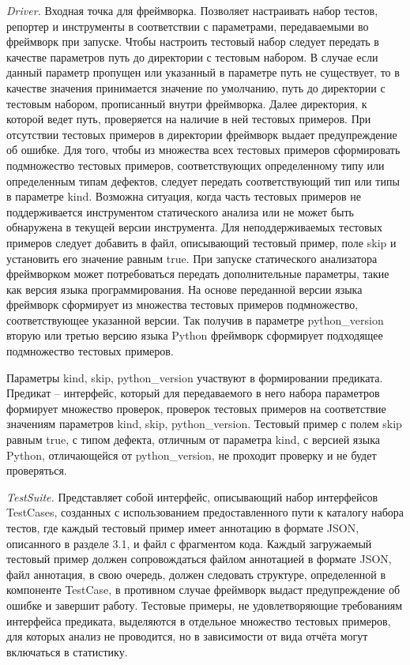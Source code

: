 \textit{Driver.} Входная точка для фреймворка. Позволяет настраивать набор тестов, репортер и инструменты в соответствии с параметрами, передаваемыми во фреймворк при запуске. Чтобы настроить тестовый набор следует передать
в качестве параметров путь до директории с тестовым набором. В случае если данный
параметр пропущен или указанный в параметре путь не существует, то в качестве значения принимается значение по умолчанию, путь до директории с тестовым набором, прописанный внутри фреймворка. Далее директория, к которой
ведет путь, проверяется на наличие в ней тестовых примеров. При отсутствии тестовых примеров в директории фреймворк выдает предупреждение об ошибке.
Для того, чтобы из множества всех тестовых
примеров сформировать подмножество тестовых примеров, соответствующих
определенному типу или определенным типам дефектов, следует передать соответствующий тип или типы в параметре kind. Возможна ситуация, когда часть
тестовых примеров не поддерживается инструментом статического анализа или не может быть обнаружена в текущей версии инструмента. Для
неподдерживаемых тестовых примеров следует добавить в файл, описывающий
тестовый пример, поле skip и установить его значение равным true.
При запуске статического анализатора фреймворком может потребоваться передать дополнительные параметры, такие как версия языка программирования. 
На основе переданной версии языка фреймворк сформирует из множества тестовых примеров подмножество, соответствующее указанной версии.
Так получив в параметре python\_version вторую или третью версию языка Python фреймворк сформирует подходящее подмножество тестовых примеров. 

Параметры kind, skip, python\_version участвуют в формировании предиката. Предикат
-- интерфейс, который для передаваемого в него набора параметров формирует
множество проверок, проверок тестовых примеров на соответствие значениям параметров kind, skip, python\_version. Тестовый пример с полем skip равным true,
с типом дефекта, отличным от параметра kind, с версией языка Python, отличающейся от python\_version, не проходит проверку и не будет проверяться. 


\textit{TestSuite.} Представляет собой интерфейс, описывающий набор интерфейсов TestCases, созданных с использованием предоставленного пути к каталогу набора тестов, где каждый тестовый
пример имеет аннотацию в формате JSON, описанного в разделе 3.1, и файл с фрагментом кода. Каждый загружаемый тестовый пример должен сопровождаться файлом аннотацией
в формате JSON, файл аннотация, в свою очередь, должен следовать структуре, определенной в компоненте TestCase, в противном случае фреймворк выдаст
предупреждение об ошибке и завершит работу. Тестовые примеры, не удовлетворяющие требованиям интерфейса предиката, выделяются в отдельное множество
тестовых примеров, для которых анализ не проводится, но в зависимости от вида отчёта могут включаться в статистику. 


